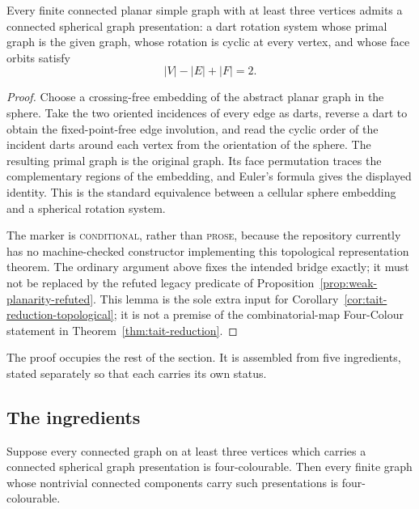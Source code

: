 \begin{lemma}
\label{lem:planar-spherical-presentation}
Every finite connected planar simple graph with at least three vertices
admits a connected spherical graph presentation: a dart rotation system
whose primal graph is the given graph, whose rotation is cyclic at every
vertex, and whose face orbits satisfy
\[
  |V|-|E|+|F|=2.
\]
\end{lemma}

\begin{proof}
Choose a crossing-free embedding of the abstract planar graph in the sphere.
Take the two oriented incidences of every edge as darts, reverse a dart to
obtain the fixed-point-free edge involution, and read the cyclic order of
the incident darts around each vertex from the orientation of the sphere.
The resulting primal graph is the original graph.  Its face permutation
traces the complementary regions of the embedding, and Euler's formula gives
the displayed identity.  This is the standard equivalence between a cellular
sphere embedding and a spherical rotation system.

The marker is \textsc{conditional}, rather than \textsc{prose}, because the
repository currently has no machine-checked constructor implementing this
topological representation theorem.  The ordinary argument above fixes the
intended bridge exactly; it must not be replaced by the refuted legacy
predicate of Proposition~\ref{prop:weak-planarity-refuted}.  This lemma is the
sole extra input for Corollary~\ref{cor:tait-reduction-topological}; it is not
a premise of the combinatorial-map Four-Colour statement in
Theorem~\ref{thm:tait-reduction}.
\end{proof}

The proof occupies the rest of the section. It is assembled from five
ingredients, stated separately so that each carries its own status.

\subsection{The ingredients}

\begin{lemma}\label{lem:components}
Suppose every connected graph on at least three vertices which carries a
connected spherical graph presentation is four-colourable.  Then every
finite graph whose nontrivial connected components carry such presentations
is four-colourable.
\end{lemma}

